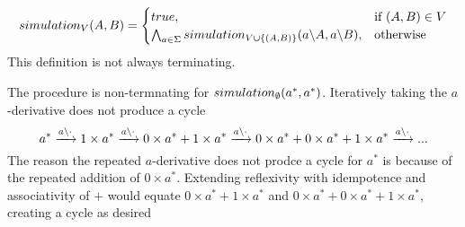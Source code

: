\documentclass[a4paper,UKenglish,cleveref, autoref, thm-restate]{lipics-v2021}
\begin{document}
\begin{align}
\simulationb{V}{A}{B} =\begin{cases}
			\true, & \text{if }(A,B) \in V\\
                      \bigwedge_{a \in \Sigma}\simulationb{V \cup \{(A,B)\}}{\derive{a}{A}}{\derive{a}{B}}, & \text{otherwise}
		 \end{cases}
\end{align}
This definition is not always terminating.
\begin{example}
The procedure is non-termnating for $\simulationb{\emptyset}{a^*}{a^*}$. Iteratively taking the $a$-derivative does not produce a cycle
\[a^* \xrightarrow{a \backslash \cdot} 1 \times a^* \xrightarrow{a \backslash \cdot} 0 \times a^* + 1 \times a^* \xrightarrow{a \backslash \cdot} 0 \times a^* + 0 \times a^* + 1\times a^* \xrightarrow{a \backslash \cdot} ... \]
The reason the repeated $a$-derivative does not prodce a cycle for $a^*$ is because of the repeated addition of $0 \times a^*$. Extending reflexivity with idempotence and associativity of $+$ would equate $ 0 \times a^* + 1 \times a^*$ and $0 \times a^* + 0 \times a^* + 1\times a^*$, creating a cycle as desired
\end{example}
\end{document}
